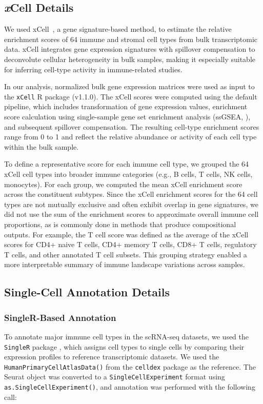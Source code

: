 \documentclass[
  12pt]{article}
\begin{document}
\subsection{\textit{x}Cell Details}
We used xCell~\citep{aran2017xcell}, a gene signature-based method, to estimate the relative enrichment scores of 64 immune and stromal cell types from bulk transcriptomic data. xCell integrates gene expression signatures with spillover compensation to deconvolute cellular heterogeneity in bulk samples, making it especially suitable for inferring cell-type activity in immune-related studies.

In our analysis, normalized bulk gene expression matrices were used as input to the \texttt{xCell} R package (v1.1.0). The xCell scores were computed using the default pipeline, which includes transformation of gene expression values, enrichment score calculation using single-sample gene set enrichment analysis (ssGSEA, \citealp{barbie2009systematic}), and subsequent spillover compensation. The resulting cell-type enrichment scores range from 0 to 1 and reflect the relative abundance or activity of each cell type within the bulk sample.

To define a representative score for each immune cell type, we grouped the 64 xCell cell types into broader immune categories (e.g., B cells, T cells, NK cells, monocytes). For each group, we computed the mean xCell enrichment score across the constituent subtypes. Since the xCell enrichment scores for the 64 cell types are not mutually exclusive and often exhibit overlap in gene signatures, we did not use the sum of the enrichment scores to approximate overall immune cell proportions, as is commonly done in methods that produce compositional outputs. For example, the T cell score was defined as the average of the xCell scores for CD4+ naive T cells, CD4+ memory T cells, CD8+ T cells, regulatory T cells, and other annotated T cell subsets. This grouping strategy enabled a more interpretable summary of immune landscape variations across samples.

\subsection{Single-Cell Annotation Details}
\subsubsection*{SingleR-Based Annotation}

To annotate major immune cell types in the scRNA-seq datasets, we used the \texttt{SingleR} package \cite{aran2019reference}, which assigns cell types to single cells by comparing their expression profiles to reference transcriptomic datasets. We used the \texttt{HumanPrimaryCellAtlasData()} from the \texttt{celldex} package as the reference. The Seurat object was converted to a \texttt{SingleCellExperiment} format using \texttt{as.SingleCellExperiment()}, and annotation was performed with the following call:
\end{document}
